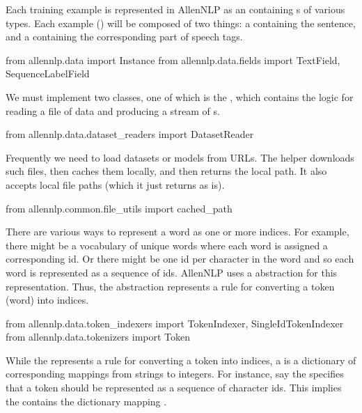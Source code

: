 Each training example is represented in AllenNLP as an  containing s of various types. Each example () will be composed of two things: a  containing the sentence, and a  containing the corresponding part of speech tags.


\begin{pythonCode}

from allennlp.data import Instance
from allennlp.data.fields import TextField, SequenceLabelField

\end{pythonCode}

We must implement two classes, one of which is the , which contains the logic for reading a file of data and producing a stream of s.

\begin{pythonCode}
from allennlp.data.dataset_readers import DatasetReader

\end{pythonCode}


Frequently we need to load datasets or models from URLs. The   helper downloads such files, then caches them locally, and then returns the local path. It also accepts local file paths (which it just returns as is).

\begin{pythonCode}

from allennlp.common.file_utils import cached_path
\end{pythonCode}

There are various ways to represent a word as one or more indices. For example, there might be a vocabulary of unique words where each word is assigned a corresponding id. Or there might be one id per character in the word and so each word is represented as a sequence of ids. AllenNLP uses a  abstraction for this representation. Thus, the  abstraction represents a rule for converting a token (word) into indices.


\begin{pythonCode}
from allennlp.data.token_indexers import TokenIndexer, SingleIdTokenIndexer
from allennlp.data.tokenizers import Token
\end{pythonCode}

While the  represents a rule for converting a token into indices, a  is a dictionary of corresponding mappings from strings to integers. For instance, say the  specifies that a token should be represented as a sequence of character ids. This implies the  contains the dictionary mapping . 

